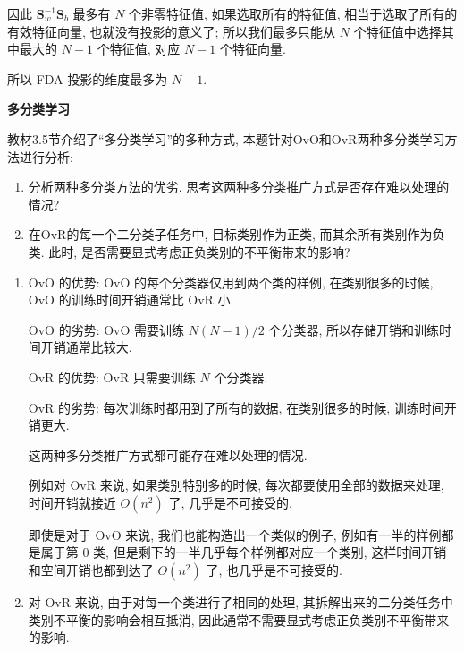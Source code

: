 \documentclass[answers]{exam}  %
\begin{document}
\begin{questions}
\begin{solution}
\begin{enumerate}
            因此 $\bm{S}_{w}^{-1}\bm{S}_{b}$ 最多有 $N$ 个非零特征值, 如果选取所有的特征值, 相当于选取了所有的有效特征向量, 也就没有投影的意义了; 所以我们最多只能从 $N$ 个特征值中选择其中最大的 $N-1$ 个特征值, 对应 $N-1$ 个特征向量.

            所以 FDA 投影的维度最多为 $N-1$.
    \end{enumerate}
  \end{solution}


  \question [20] \textbf{多分类学习}

  教材3.5节介绍了“多分类学习”的多种方式, 本题针对OvO和OvR两种多分类学习方法进行分析:
  \begin{enumerate}
    \item 分析两种多分类方法的优劣. 思考这两种多分类推广方式是否存在难以处理的情况?
    \item 在OvR的每一个二分类子任务中, 目标类别作为正类, 而其余所有类别作为负类. 此时, 是否需要显式考虑正负类别的不平衡带来的影响?
  \end{enumerate}
  \begin{solution}
    \begin{enumerate}
      \item

            OvO 的优势: OvO 的每个分类器仅用到两个类的样例, 在类别很多的时候, OvO 的训练时间开销通常比 OvR 小.

            OvO 的劣势: OvO 需要训练 $N(N-1)/2$ 个分类器, 所以存储开销和训练时间开销通常比较大.

            OvR 的优势: OvR 只需要训练 $N$ 个分类器.

            OvR 的劣势: 每次训练时都用到了所有的数据, 在类别很多的时候, 训练时间开销更大.

            这两种多分类推广方式都可能存在难以处理的情况.

            例如对 OvR 来说, 如果类别特别多的时候, 每次都要使用全部的数据来处理, 时间开销就接近 $O(n^{2})$ 了, 几乎是不可接受的.

            即使是对于 OvO 来说, 我们也能构造出一个类似的例子, 例如有一半的样例都是属于第 0 类, 但是剩下的一半几乎每个样例都对应一个类别, 这样时间开销和空间开销也都到达了 $O(n^{2})$ 了, 也几乎是不可接受的.

      \item

            对 OvR 来说, 由于对每一个类进行了相同的处理, 其拆解出来的二分类任务中类别不平衡的影响会相互抵消, 因此通常不需要显式考虑正负类别不平衡带来的影响.
    \end{enumerate}
  \end{solution}

\end{questions}
\end{document}

